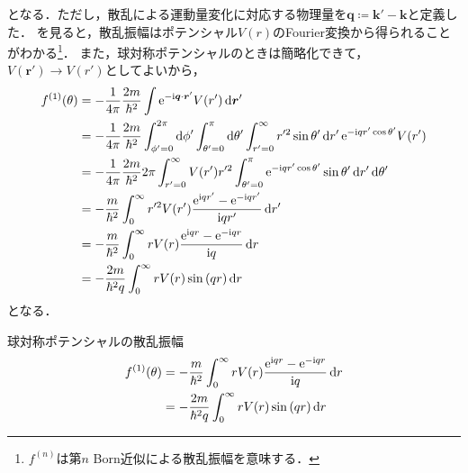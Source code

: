\documentclass{report}
\begin{document}
  となる．ただし，散乱による運動量変化に対応する物理量を$\bm{q} \coloneqq \bm{k'} - \bm{k}$と定義した．
  を見ると，散乱振幅はポテンシャル$V(r)$のFourier変換から得られることがわかる\footnote{
    $f^{(n)}$は第$n$ Born近似による散乱振幅を意味する．
  }．
  また，球対称ポテンシャルのときは簡略化できて，$V(\bm{r'}) \to V(r')$としてよいから，
  \begin{align}
    f^{(1)}(\theta) &= -\frac{1}{4\pi}\frac{2m}{\hbar^2}\int\mathrm{e}^{-\mathrm{i} \bm{q}\cdot \bm{r}'} V(r') \dd{\bm{r}'}\\
    &= -\frac{1}{4\pi}\frac{2m}{\hbar^2} \int_{\phi' = 0}^{2\pi}\dd{\phi'} \int_{\theta' = 0}^{\pi}\dd{\theta'}\int_{r' = 0}^{\infty}r'^2 \sin\theta' \dd{r'} \mathrm{e}^{-\mathrm{i} qr' \cos\theta'} V(r') \\
    &= -\frac{1}{4\pi}\frac{2m}{\hbar^2} 2\pi \int_{r' = 0}^{\infty}V(r')r'^2\int_{\theta' = 0}^{\pi} \mathrm{e}^{-\mathrm{i} qr' \cos\theta'} \sin\theta' \dd{r'}\dd{\theta'} \\ 
    &= -\frac{m}{\hbar^2} \int_{0}^{\infty} r'^2V(r') \frac{\mathrm{e}^{\mathrm{i} qr'} - \mathrm{e}^{-\mathrm{i} qr'}}{\mathrm{i} qr'} \dd{r'} \\ 
    &= -\frac{m}{\hbar^2} \int_{0}^{\infty} rV(r) \frac{\mathrm{e}^{\mathrm{i} qr} - \mathrm{e}^{-\mathrm{i} qr}}{\mathrm{i} q} \dd{r} \\ 
    &= -\frac{2m}{\hbar^2 q} \int_{0}^{\infty} rV(r)\sin\qty(qr) \dd{r}
  \end{align}
  となる．
  \begin{itembox}[l]{球対称ポテンシャルの散乱振幅}
    \begin{align}
      f^{(1)}(\theta) &= -\frac{m}{\hbar^2} \int_{0}^{\infty} rV(r) \frac{\mathrm{e}^{\mathrm{i} qr} - \mathrm{e}^{-\mathrm{i} qr}}{\mathrm{i} q} \dd{r}\label{SCamp1st-exp} \\ 
      &= -\frac{2m}{\hbar^2 q} \int_{0}^{\infty} rV(r)\sin\qty(qr) \dd{r}\label{SCamp1st-sin}
    \end{align}
  \end{itembox}
\end{document}
